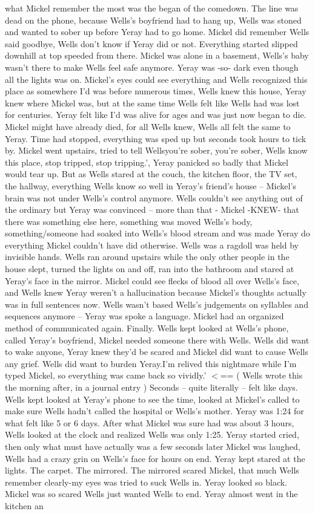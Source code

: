 \documentclass[12pt]{book}
\begin{document}
what Mickel remember the most was the began of the comedown. The line was dead on the phone, because Wells's boyfriend had to hang up, Wells was stoned and wanted to sober up before Yeray had to go home. Mickel did remember Wells said goodbye, Wells don't know if Yeray did or not. Everything started slipped downhill at top speeded from there. Mickel was alone in a basement, Wells's baby wasn't there to make Wells feel safe anymore. Yeray was -so- dark even though all the lights was on. Mickel's eyes could see everything and Wells recognized this place as somewhere I'd was before numerous times, Wells knew this house, Yeray knew where Mickel was, but at the same time Wells felt like Wells had was lost for centuries. Yeray felt like I'd was alive for ages and was just now began to die. Mickel might have already died, for all Wells knew, Wells all felt the same to Yeray. Time had stopped, everything was sped up but seconds took hours to tick by. Mickel went upstairs, tried to tell Wellsyou're sober, you're sober, Wells know this place, stop tripped, stop tripping.', Yeray panicked so badly that Mickel would tear up. But as Wells stared at the couch, the kitchen floor, the TV set, the hallway, everything Wells know so well in Yeray's friend's house -- Mickel's brain was not under Wells's control anymore. Wells couldn't see anything out of the ordinary but Yeray was convinced -- more than that - Mickel -KNEW- that there was something else here, something was moved Wells's body, something/someone had soaked into Wells's blood stream and was made Yeray do everything Mickel couldn't have did otherwise. Wells was a ragdoll was held by invisible hands. Wells ran around upstairs while the only other people in the house slept, turned the lights on and off, ran into the bathroom and stared at Yeray's face in the mirror. Mickel could see flecks of blood all over Wells's face, and Wells knew Yeray weren't a hallucination because Mickel's thoughts actually was in full sentences now. Wells wasn't based Wells's judgements on syllables and sequences anymore -- Yeray was spoke a language. Mickel had an organized method of communicated again. Finally. Wells kept looked at Wells's phone, called Yeray's boyfriend, Mickel needed someone there with Wells. Wells did want to wake anyone, Yeray knew they'd be scared and Mickel did want to cause Wells any grief. Wells did want to burden Yeray.I'm relived this nightmare while I'm typed Mickel, so everything was came back so vividly.' $<$== ( Wells wrote this the morning after, in a journal entry ) Seconds -- quite literally -- felt like days. Wells kept looked at Yeray's phone to see the time, looked at Mickel's called to make sure Wells hadn't called the hospital or Wells's mother. Yeray was 1:24 for what felt like 5 or 6 days. After what Mickel was sure had was about 3 hours, Wells looked at the clock and realized Wells was only 1:25. Yeray started cried, then only what must have actually was a few seconds later Mickel was laughed, Wells had a crazy grin on Wells's face for hours on end. Yeray kept stared at the lights. The carpet. The mirrored. The mirrored scared Mickel, that much Wells remember clearly-my eyes was tried to suck Wells in. Yeray looked so black. Mickel was so scared Wells just wanted Wells to end. Yeray almost went in the kitchen an 
\end{document}
